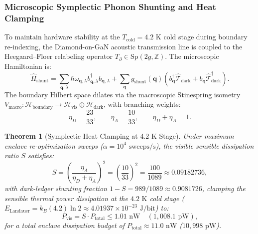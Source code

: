 \documentclass[11pt,onecolumn]{article}
\newtheorem{theorem}{Theorem}
\begin{document}
\subsubsection{Microscopic Symplectic Phonon Shunting and Heat Clamping}
To maintain hardware stability at the $T_{\text{cold}} = 4.2\text{ K}$ cold stage during boundary re-indexing, the Diamond-on-GaN acoustic transmission line is coupled to the Heegaard--Floer relabeling operator $T_\partial \in \mathrm{Sp}(2g, \mathbb{Z})$. The microscopic Hamiltonian is:
\begin{equation}
    \hat{H}_{\text{shunt}} = \sum_{\mathbf{q},\lambda} \hbar \omega_{\mathbf{q},\lambda} b_{\mathbf{q},\lambda}^\dagger b_{\mathbf{q},\lambda} + \sum_{\mathbf{q}} g_{\text{shunt}}(\mathbf{q}) \left( b_{\mathbf{q}}^\dagger \hat{\mathcal{T}}_{\text{dark}} + b_{\mathbf{q}} \hat{\mathcal{T}}_{\text{dark}}^\dagger \right).
\end{equation}
The boundary Hilbert space dilates via the macroscopic Stinespring isometry $V_{\text{macro}}: \mathcal{H}_{\text{boundary}} \to \mathcal{H}_{\text{vis}} \oplus \mathcal{H}_{\text{dark}}$, with branching weights:
\begin{equation}
    \eta_D = \frac{23}{33}, \qquad \eta_A = \frac{10}{33}, \qquad \eta_D + \eta_A = 1.
\end{equation}

\begin{theorem}[Symplectic Heat Clamping at 4.2 K Stage]
\label{thm:dissipation_clamping}
Under maximum enclave re-optimization sweeps ($\alpha = 10^4\text{ sweeps/s}$), the visible sensible dissipation ratio $S$ satisfies:
\begin{equation}
    S = \left(\frac{\eta_A}{\eta_D + \eta_A}\right)^2 = \left(\frac{10}{33}\right)^2 = \frac{100}{1089} \approx 0.09182736,
\end{equation}
with dark-ledger shunting fraction $1 - S = 989/1089 \approx 0.9081726$, clamping the sensible thermal power dissipation at the $4.2\text{ K}$ cold stage ($E_{\text{Landauer}} = k_B(4.2)\ln 2 \approx 4.01937 \times 10^{-23}\text{ J/bit}$) to:
\begin{equation}
    P_{\text{vis}} = S \cdot P_{\text{total}} \le 1.01\text{ nW} \quad (1{,}008.1\text{ pW}),
\end{equation}
for a total enclave dissipation budget of $P_{\text{total}} \approx 11.0\text{ nW}$ ($10{,}998\text{ pW}$).
\end{theorem}
\end{document}
